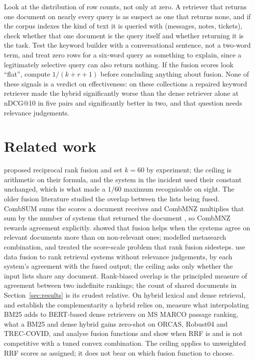 \documentclass[11pt]{article}
\begin{document}
Look at the distribution of row counts, not only at zero. A retriever that returns one document on nearly every query is as suspect as one that returns none, and if the corpus indexes the kind of text it is queried with (messages, notes, tickets), check whether that one document is the query itself and whether returning it is the task. Test the keyword builder with a conversational sentence, not a two-word term, and treat zero rows for a six-word query as something to explain, since a legitimately selective query can also return nothing. If the fusion scores look ``flat'', compute $1/(k+r+1)$ before concluding anything about fusion. None of these signals is a verdict on effectiveness: on these collections a repaired keyword retriever made the hybrid significantly worse than the dense retriever alone at nDCG@10 in five pairs and significantly better in two, and that question needs relevance judgements.

\section{Related work}
\label{sec:related}

\citet{cormack2009rrf} proposed reciprocal rank fusion and set $k = 60$ by experiment; the ceiling is arithmetic on their formula, and the system in the incident used their constant unchanged, which is what made a $1/60$ maximum recognisable on sight. The older fusion literature studied the overlap between the lists being fused. CombSUM sums the scores a document receives and CombMNZ multiplies that sum by the number of systems that returned the document \citep{fox1994combination}, so CombMNZ rewards agreement explicitly. \citet{lee1997analyses} showed that fusion helps when the systems agree on relevant documents more than on non-relevant ones; \citet{aslam2001metasearch} modelled metasearch combination, and \citet{montague2001normalization} treated the score-scale problem that rank fusion sidesteps. \citet{nuray2006ranking} use data fusion to rank retrieval systems without relevance judgements, by each system's agreement with the fused output; the ceiling asks only whether the input lists share any document. Rank-biased overlap \citep{webber2010rbo} is the principled measure of agreement between two indefinite rankings; the count of shared documents in Section~\ref{sec:results} is its crudest relative. On hybrid lexical and dense retrieval, \citet{luan2021sparse} and \citet{gao2021clear} establish the complementarity a hybrid relies on, \citet{wang2021interpolation} measure what interpolating BM25 adds to BERT-based dense retrievers on MS MARCO passage ranking, \citet{chen2022hybrid} what a BM25 and dense hybrid gains zero-shot on ORCAS, Robust04 and TREC-COVID, and \citet{bruch2023fusion} analyse fusion functions and show when RRF is and is not competitive with a tuned convex combination. The ceiling applies to unweighted RRF scores as assigned; it does not bear on which fusion function to choose.
\end{document}
